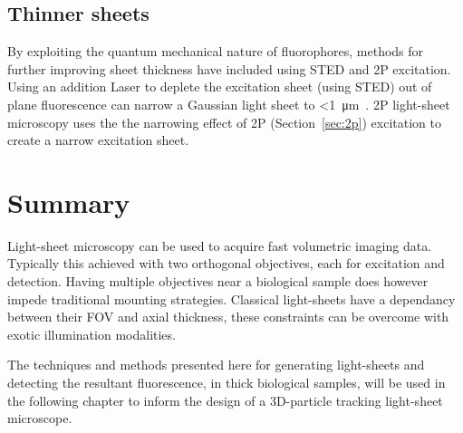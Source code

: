 \subsection{Thinner sheets}

By exploiting the quantum mechanical nature of \gls{fluorophore}s, methods for further improving sheet thickness have included using \gls{STED} and \gls{2P} excitation.
Using an addition \gls{Laser} to deplete the excitation sheet (using \gls{STED}) out of plane fluorescence can narrow a Gaussian light sheet to \SI{<1}{\micro\meter}~\cite{friedrich_sted-spim:_2011}.
\gls{2P} \gls{light-sheet} microscopy uses the the narrowing effect of \gls{2P} (Section~\ref{sec:2p}) excitation to create a narrow excitation sheet.

\section{Summary}

Light-sheet microscopy can be used to acquire fast volumetric imaging data.
Typically this achieved with two orthogonal objectives, each for excitation and detection.
Having multiple objectives near a biological sample does however impede traditional mounting strategies.
Classical light-sheets have a dependancy between their \gls{FOV} and axial thickness, these constraints can be overcome with exotic illumination modalities.

The techniques and methods presented here for generating \gls{light-sheet}s and detecting the resultant fluorescence, in thick biological samples, will be used in the following chapter to inform the design of a 3D-particle tracking \gls{light-sheet} microscope.


